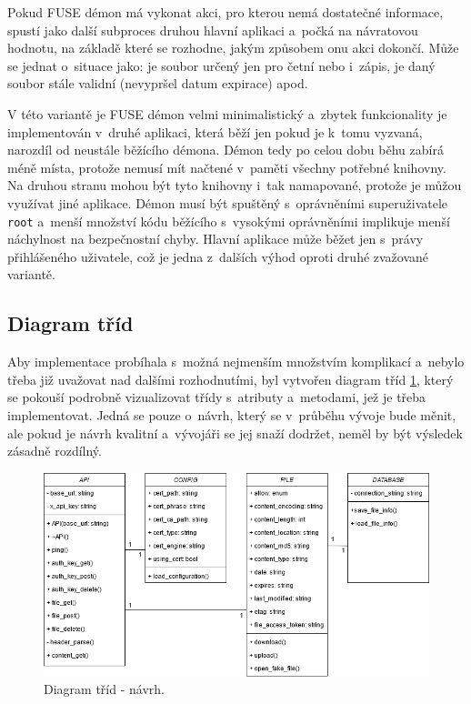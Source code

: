 Pokud FUSE démon má vykonat akci, pro kterou nemá dostatečné informace, spustí jako další subproces druhou hlavní aplikaci a počká na návratovou hodnotu, na základě
které se rozhodne, jakým způsobem onu akci dokončí. Může se jednat o situace jako: je soubor určený jen pro četní nebo i zápis, je daný soubor stále validní
(nevypršel datum expirace) apod.

V této variantě je FUSE démon velmi minimalistický a zbytek funkcionality je implementován v druhé aplikaci, která běží jen pokud je k tomu vyzvaná, narozdíl od neustále
běžícího démona. Démon tedy po celou dobu běhu zabírá méně místa, protože nemusí mít načtené v paměti všechny potřebné knihovny. Na druhou stranu mohou být tyto knihovny
i tak namapované, protože je můžou využívat jiné aplikace. Démon musí být spuštěný s oprávněními superuživatele \texttt{root} a menší množství kódu běžícího s vysokými
oprávněními implikuje menší náchylnost na bezpečnostní chyby. Hlavní aplikace může běžet jen s právy přihlášeného uživatele, což je jedna z dalších výhod oproti 
druhé zvažované variantě.

\subsection{Diagram tříd}

Aby implementace probíhala s možná nejmenším množstvím komplikací a nebylo třeba již uvažovat nad dalšími rozhodnutími, byl vytvořen diagram tříd \ref{fig:class_diagram_design},
který se pokouší podrobně vizualizovat třídy s atributy a metodami, jež je třeba implementovat. Jedná se pouze o návrh, který se v průběhu vývoje bude měnit, ale pokud je návrh
kvalitní a vývojáři se jej snaží dodržet, neměl by být výsledek zásadně rozdílný.

\begin{figure}[h]
    \centering
    \includegraphics[width=1\linewidth]{other-fig/class_diagram_design.png}
    \caption{Diagram tříd - návrh.}
    \label{fig:class_diagram_design}
\end{figure}


